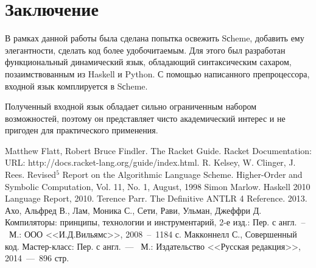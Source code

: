 \documentclass[12pt,a4paper,oneside]{extarticle}
\begin{document}
\clearpage

\section{Заключение}
    В рамках данной работы была сделана попытка освежить Sсheme, добавить ему элегантности, сделать код более удобочитаемым.
    Для этого был разработан функциональный динамический язык, обладающий синтаксическим сахаром, позаимствованным из Haskell и Python.
    С помощью написанного препроцессора, входной язык комплируется в Sсheme.

    Полученный входной язык обладает сильно ограниченным набором возможностей, поэтому он представляет чисто академический интерес и не пригоден для практического применения.
\clearpage

\begin{thebibliography}{0}
     Matthew Flatt, Robert Bruce Findler. The Racket Guide. Racket Documentation: URL: http://docs.racket-lang.org/guide/index.html.
     R. Kelsey, W. Clinger, J. Rees. Revised$^5$ Report on the Algorithmic Language Scheme. Higher-Order and Symbolic Computation, Vol. 11, No. 1, August, 1998
     Simon Marlow. Haskell 2010 Language Report, 2010.
     Terence Parr. The Definitive ANTLR 4 Reference. 2013.
     Ахо, Альфред В., Лам, Моника С., Сети, Рави, Ульман, Джеффри Д. Компиляторы: принципы, технологии и инструментарий, 2-е изд.: Пер. с англ.~--~М.: ООО <<И.Д.Вильямс>>, 2008~--~1184 с.
     Макконнелл С., Совершенный код. Мастер-класс: Пер. с англ.~---~ М.: Издательство <<Русская редакция>>, 2014~---~896 стр.        
\end{thebibliography}
\end{document}
